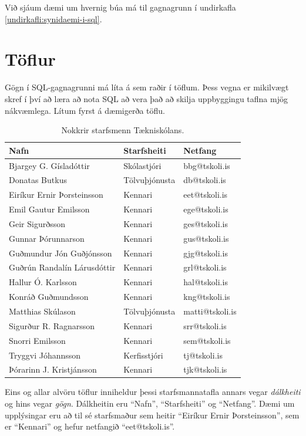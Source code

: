 Við sjáum dæmi um hvernig búa má til gagnagrunn í undirkafla \ref{undirkafli:synidaemi-i-sql}.
\section{Töflur}
Gögn í SQL-gagnagrunni má líta á sem raðir í töflum. Þess vegna er mikilvægt skref í því að læra að nota SQL að vera það að skilja uppbyggingu taflna mjög nákvæmlega.
Lítum fyrst á dæmigerða töflu.

\begin{table}
\centering
\caption[Nokkrir starfsmenn Tækniskólans]{Nokkrir starfsmenn Tækniskólans.}
\label{tafla:starfsmenn-ts}
\begin{tabular}{lll}
\toprule
Nafn&Starfsheiti&Netfang\\
\midrule
Bjargey G. Gísladóttir&Skólastjóri&bbg@tskoli.is\\
Donatas Butkus&Tölvuþjónusta&db@tskoli.is\\
Eiríkur Ernir Þorsteinsson&Kennari&eet@tskoli.is\\
Emil Gautur Emilsson&Kennari&ege@tskoli.is\\
Geir Sigurðsson&Kennari&ges@tskoli.is\\
Gunnar Þórunnarson&Kennari&gus@tskoli.is\\
Guðmundur Jón Guðjónsson&Kennari&gjg@tskoli.is\\
Guðrún Randalín Lárusdóttir&Kennari&grl@tskoli.is\\
Hallur Ó. Karlsson&Kennari&hal@tskoli.is\\
Konráð Guðmundsson&Kennari&kng@tskoli.is\\
Matthias Skúlason&Tölvuþjónusta&matti@tskoli.is\\
Sigurður R. Ragnarsson&Kennari&srr@tskoli.is\\
Snorri Emilsson&Kennari&sem@tskoli.is\\
Tryggvi Jóhannsson&Kerfisstjóri&tj@tskoli.is\\
Þórarinn J. Kristjánsson&Kennari&tjk@tskoli.is\\
\bottomrule
\end{tabular}
\end{table}
Eins og allar alvöru töflur inniheldur þessi starfsmannatafla annars vegar \emph{dálkheiti} og hins vegar \emph{gögn}. Dálkheitin eru ``Nafn'', ``Starfsheiti'' og ``Netfang''. Dæmi um upplýsingar eru að til sé starfsmaður sem heitir ``Eiríkur Ernir Þorsteinsson'', sem er ``Kennari'' og hefur netfangið ``eet@tskoli.is''. 

